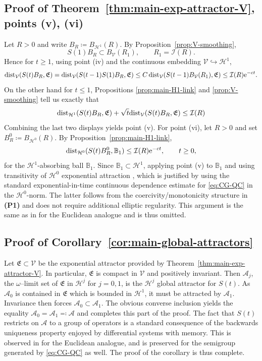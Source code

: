\documentclass[12pt,leqno]{amsart}
\def\e{{\rm e}}
\def\dist{{\rm dist}}
\theoremstyle{definition}
\numberwithin{equation}{section}
\numberwithin{figure}{section}
\begin{document}
 
 
 \subsection{Proof of Theorem~\ref{thm:main-exp-attractor-V}, points (v), (vi)}
 
Let $R>0$ and write $B_R\coloneqq B_{\mathcal H^1}(R)$. By Proposition~\ref{prop:V-smoothing},
\[
S(1)B_R \subset B_{\mathcal V}(R_1), \qquad R_1=\mathcal I(R).
\]
Hence for $t\ge 1$, using point \textup{(iv)}  and the continuous embedding
$\mathcal V\hookrightarrow \mathcal H^1$,
\[
\dist_{\mathcal V}(S(t)B_R,\mathfrak E)
=\dist_{\mathcal V}(S(t-1)S(1)B_R,\mathfrak E)
\le C\,\dist_{\mathcal V}(S(t-1)B_{\mathcal V}(R_1),\mathfrak E)
\le \mathcal I(R)\e^{-ct}.
\]
On the other hand for $t\leq 1 $, Propositions \ref{prop:main-H1-link} and  \ref{prop:V-smoothing} tell us exactly that
\[
\dist_{\mathcal H^1}(S(t)B_R,\mathfrak E) +
\sqrt{t}\dist_{\mathcal V}(S(t)B_R,\mathfrak E) \leq \mathcal I(R)
\]
Combining the last two displays yields point \textup{(v)}.
For point (vi), 
let $R>0$ and set $B^0_R\coloneqq B_{\mathcal H^0}(R)$. By Proposition~\ref{prop:main-H1-link},
\[
\dist_{\mathcal H^0}(S(t)B^0_R,\mathbb B_1)\le \mathcal I(R)\e^{-ct}, \qquad t\ge 0,
\]
for the $\mathcal H^1$-absorbing ball $\mathbb B_1$.
Since $\mathbb B_1\subset \mathcal H^1$, applying point \textup{(v)} to $\mathbb B_1$ and using transitivity of $\mathcal H^0$ exponential attraction \cite{EMZ}, which is justified by using the standard exponential-in-time continuous dependence estimate for \eqref{eq:CG-QC} in the $\mathcal H^0$-norm.
The latter follows from the coercivity/monotonicity structure in \textbf{(P1)} and does not require additional elliptic regularity.
This argument is the same as in \cite{AMN} for the Euclidean analogue and is thus omitted.

\subsection{Proof of Corollary~\ref{cor:main-global-attractors}}
Let $\mathfrak E\subset\mathcal V$ be the exponential attractor provided by
Theorem~\ref{thm:main-exp-attractor-V}. In particular, $\mathfrak E$ is compact in $\mathcal V$ and
positively invariant. Then  $\mathcal A_j$, the $\omega$--limit set of $ \mathfrak E$ in $\mathcal H^j$ for $j=0,1$, is the $\mathcal H^j$ global attractor for $S(t)$. As $\mathcal A_0 $ is contained in $\mathfrak E$ which is bounded in $\mathcal H^1$, it must be attracted by $\mathcal A_1$. Invariance then forces $\mathcal A_0\subset \mathcal A_1$. The obvious converse inclusion yields the equality $\mathcal A_0=\mathcal A_1 \eqqcolon \mathcal A$ and completes this part of the proof. The fact that $S(t)$ restricts on $\mathcal A$ to a group of operators is a standard consequence of the backwards uniqueness property enjoyed by differential systems with memory. This is observed in \cite{AMN} for the Euclidean analogue,  and is preserved for the semigroup generated by \eqref{eq:CG-QC} as well. The proof of the corollary is thus complete.
 

\end{document}
